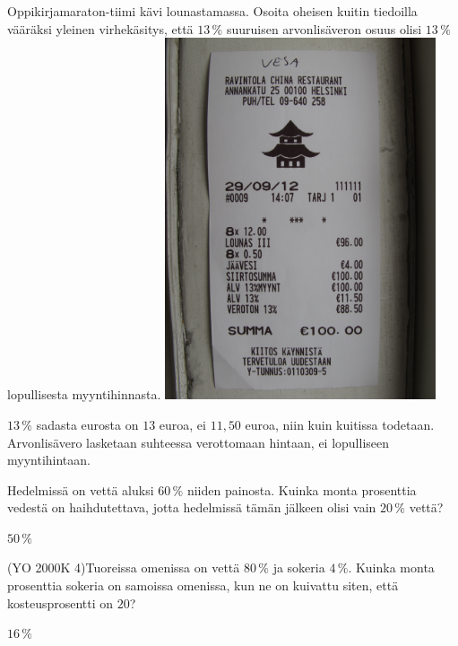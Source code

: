 \begin{tehtavasivu}
\begin{tehtava}
    Oppikirjamaraton-tiimi kävi lounastamassa. Osoita oheisen kuitin tiedoilla vääräksi yleinen virhekäsitys,
    että $13\,\%$ suuruisen arvonlisäveron osuus olisi $13\,\%$ lopullisesta myyntihinnasta.
    \includegraphics[width=80mm, angle=270]{pictures/alv-kuitti}
    \begin{vastaus}
         $13\,\%$ sadasta eurosta on $13$ euroa, ei $11,50$ euroa, niin kuin kuitissa todetaan. Arvonlisävero
         lasketaan suhteessa verottomaan hintaan, ei lopulliseen myyntihintaan.
    \end{vastaus}
\end{tehtava}

\begin{tehtava}
    Hedelmissä on vettä aluksi $60\,\%$ niiden painosta. Kuinka monta prosenttia vedestä on haihdutettava, jotta hedelmissä tämän jälkeen olisi vain $20\,\%$ vettä?
    \begin{vastaus}
        $50\,\%$
    \end{vastaus}
\end{tehtava}

\begin{tehtava}
    (YO 2000K 4)Tuoreissa omenissa on vettä $80\,\%$ ja sokeria $4\,\%$. Kuinka monta prosenttia sokeria on samoissa omenissa, kun ne on kuivattu siten, että kosteusprosentti on $20$?
    \begin{vastaus}
        $16\,\%$
    \end{vastaus}
\end{tehtava}


\end{tehtavasivu}
